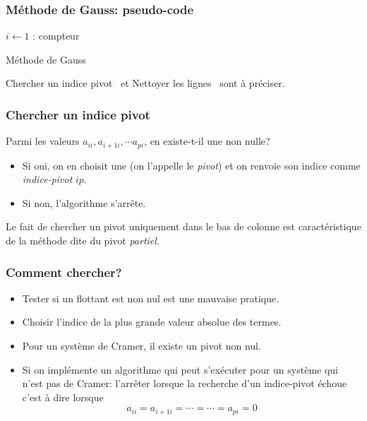 \begin{frame}
  \frametitle{Méthode de Gauss: pseudo-code}
\begin{algorithm}[H]
  $i\leftarrow 1$ : compteur\;
  \caption{Méthode de Gauss}
  \label{resolsystlin_1}
\end{algorithm}
\og Chercher un indice pivot\fg~ et \og Nettoyer les lignes\fg~ sont à préciser.  
\end{frame}

\begin{frame}
  \frametitle{Chercher un indice pivot}
Parmi les valeurs $a_{i i}, a_{i+1 i}, \cdots a_{p i}$, en existe-t-il une non nulle? 
\begin{itemize}
  \item Si oui, on en choisit une (on l'appelle le \emph{pivot}) et on renvoie son indice comme \emph{indice-pivot} $ip$.
  \item Si non, l'algorithme s'arrête.
\end{itemize}
Le fait de chercher un pivot uniquement dans le bas de colonne est caractéristique de la méthode dite du pivot \emph{partiel}.
\end{frame}

\begin{frame}
  \frametitle{Comment chercher?}
\begin{itemize}
  \item Tester si un flottant est non nul est une mauvaise pratique.
  \item Choisir l'indice de la plus grande valeur absolue des termes.
  \item Pour un système de Cramer, il existe un pivot non nul.
  \item Si on implémente un algorithme qui peut s'exécuter pour un système qui n'est pas de Cramer: l'arrêter lorsque la recherche d'un indice-pivot échoue c'est à dire lorsque
\begin{displaymath}
a_{i i} = a_{i+1 i} = \cdots = \cdots = a_{p i}=0  
\end{displaymath}
\end{itemize}
\end{frame}

